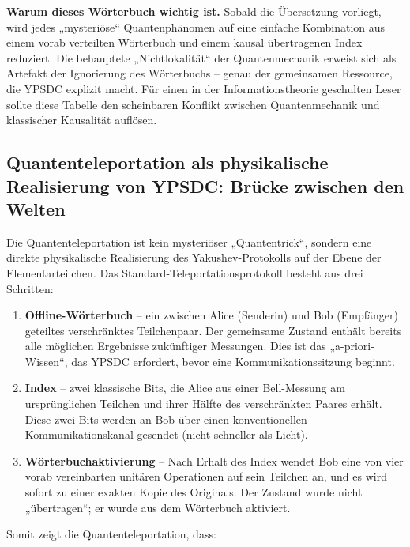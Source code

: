 \documentclass[12pt,a4paper]{article}
\theoremstyle{remark}
\begin{document}
	\noindent
	\textbf{Warum dieses Wörterbuch wichtig ist.} Sobald die Übersetzung vorliegt, wird jedes „mysteriöse“ Quantenphänomen auf eine einfache Kombination aus einem vorab verteilten Wörterbuch und einem kausal übertragenen Index reduziert. Die behauptete „Nichtlokalität“ der Quantenmechanik erweist sich als Artefakt der Ignorierung des Wörterbuchs – genau der gemeinsamen Ressource, die YPSDC explizit macht. Für einen in der Informationstheorie geschulten Leser sollte diese Tabelle den scheinbaren Konflikt zwischen Quantenmechanik und klassischer Kausalität auflösen.
	
	\subsection{Quantenteleportation als physikalische Realisierung von YPSDC: Brücke zwischen den Welten}
	
	Die Quantenteleportation ist kein mysteriöser „Quantentrick“, sondern eine direkte physikalische Realisierung des Yakushev-Protokolls auf der Ebene der Elementarteilchen. Das Standard-Teleportationsprotokoll besteht aus drei Schritten:
	
	\begin{enumerate}
		\item \textbf{Offline-Wörterbuch} – ein zwischen Alice (Senderin) und Bob (Empfänger) geteiltes verschränktes Teilchenpaar. Der gemeinsame Zustand enthält bereits alle möglichen Ergebnisse zukünftiger Messungen. Dies ist das „a-priori-Wissen“, das YPSDC erfordert, bevor eine Kommunikationssitzung beginnt.
		\item \textbf{Index} – zwei klassische Bits, die Alice aus einer Bell-Messung am ursprünglichen Teilchen und ihrer Hälfte des verschränkten Paares erhält. Diese zwei Bits werden an Bob über einen konventionellen Kommunikationskanal gesendet (nicht schneller als Licht).
		\item \textbf{Wörterbuchaktivierung} – Nach Erhalt des Index wendet Bob eine von vier vorab vereinbarten unitären Operationen auf sein Teilchen an, und es wird sofort zu einer exakten Kopie des Originals. Der Zustand wurde nicht „übertragen“; er wurde aus dem Wörterbuch aktiviert.
	\end{enumerate}
	
	Somit zeigt die Quantenteleportation, dass:
	
\end{document}
